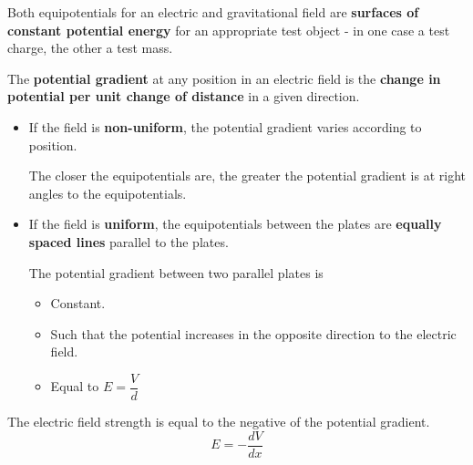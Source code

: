 Both equipotentials for an electric and gravitational field are \textbf{surfaces of constant potential energy} for an appropriate test object - in one case a test charge, the other a test mass.

The \textbf{potential gradient} at any position in an electric field is the \textbf{change in potential per unit change of distance} in a given direction.
\begin{itemize}
    \item If the field is \textbf{non-uniform}, the potential gradient varies according to position.

        The closer the equipotentials are, the greater the potential gradient is at right angles to the equipotentials.
    \item If the field is \textbf{uniform}, the equipotentials between the plates are \textbf{equally spaced lines} parallel to the plates.

        The potential gradient between two parallel plates is
        \begin{itemize}
            \item Constant.
            \item Such that the potential increases in the opposite direction to the electric field.
            \item Equal to $E=\dfrac{V}{d}$
        \end{itemize}
\end{itemize}

The electric field strength is equal to the negative of the potential gradient.
$$E=-\frac{dV}{dx}$$
